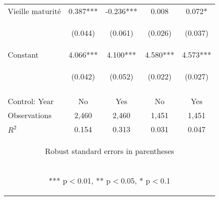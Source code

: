 \begin{center}
\begin{tabular}{lcccc}
Vieille maturité & 0.387*** & -0.236*** & 0.008 & 0.072* \\
\vspace{4pt} & \begin{footnotesize}(0.044)\end{footnotesize} & \begin{footnotesize}(0.061)\end{footnotesize} & \begin{footnotesize}(0.026)\end{footnotesize} & \begin{footnotesize}(0.037)\end{footnotesize} \\
Constant & 4.066*** & 4.100*** & 4.580*** & 4.573*** \\
 & \begin{footnotesize}(0.042)\end{footnotesize} & \begin{footnotesize}(0.052)\end{footnotesize} & \begin{footnotesize}(0.022)\end{footnotesize} & \begin{footnotesize}(0.027)\end{footnotesize} \\
\vspace{4pt} & \begin{footnotesize}\end{footnotesize} & \begin{footnotesize}\end{footnotesize} & \begin{footnotesize}\end{footnotesize} & \begin{footnotesize}\end{footnotesize} \\
Control: Year & No & Yes & No & Yes \\ \hline
Observations & 2,460 & 2,460 & 1,451 & 1,451 \\
 $R^2$ & 0.154 & 0.313 & 0.031 & 0.047 \\ \hline
\multicolumn{5}{c}{\begin{footnotesize} Robust standard errors in parentheses\end{footnotesize}} \\
\multicolumn{5}{c}{\begin{footnotesize} *** p$<$0.01, ** p$<$0.05, * p$<$0.1\end{footnotesize}} \\
\end{tabular}
\end{center}
